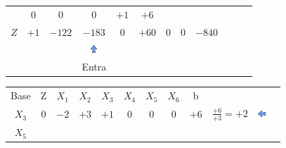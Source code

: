 \begin{frame}
{\begin{table}
\begin{tabular}{c c c c c c c c c c c c}
				& \cellcolor{yellow!50} $\scriptstyle 0$
				& \cellcolor{yellow!50} $\scriptstyle 0$
				& \cellcolor{yellow!50} $\scriptstyle 0$
				& \cellcolor{yellow!50} $\scriptstyle +1$
				& \cellcolor{yellow!50} $\scriptstyle +6$ \\
				\cellcolor{blue!100} \color{white} $\scriptstyle Z$
				& \cellcolor{yellow!50} $\scriptstyle +1$
				& \cellcolor{yellow!50} $\scriptstyle -122$
				& \cellcolor{gray!50} $\scriptstyle -183$
				& \cellcolor{yellow!50} $\scriptstyle 0$
				& \cellcolor{yellow!50} $\scriptstyle +60$
				& \cellcolor{yellow!50} $\scriptstyle 0$
				& \cellcolor{yellow!50} $\scriptstyle 0$ 
				& \cellcolor{yellow!50} $\scriptstyle -840$  \\
				& & & \includegraphics[width=0.3cm,height=0.3cm]{setacima.jpg} \\
				& & & \scriptsize Entra\\ 
			\end{tabular}
		\end{table}			
	}
	{
		\begin{table}		
			\begin{tabular}{c c c c c c c c c c c c}
				\cline{1-8} 
				\cellcolor{blue!100} \color{white} \scriptsize Base 
				&\cellcolor{blue!100} \color{white} \scriptsize Z 
				&\cellcolor{blue!100} \color{white} $\scriptstyle X_1$ 
				&\cellcolor{blue!100} \color{white} $\scriptstyle X_2$ 
				&\cellcolor{blue!100} \color{red}   $\scriptstyle X_3$ 
				&\cellcolor{blue!100} \color{white} $\scriptstyle X_4$ 
				&\cellcolor{blue!100} \color{red}   $\scriptstyle X_5$ 
				&\cellcolor{blue!100} \color{red}   $\scriptstyle X_6$ 
				&\cellcolor{blue!100} \color{white} \scriptsize b
				&
				&
				& \\
				\cellcolor{blue!100} \color{red} $\scriptstyle X_3$
				& \cellcolor{yellow!50} $\scriptstyle 0$
				& \cellcolor{yellow!50} $\scriptstyle -2$
				& \cellcolor{gray!50} $\scriptstyle +3$
				& \cellcolor{yellow!50} $\scriptstyle +1$
				& \cellcolor{yellow!50} $\scriptstyle 0$
				& \cellcolor{yellow!50} $\scriptstyle 0$
				& \cellcolor{yellow!50} $\scriptstyle 0$
				& \cellcolor{gray!50} $\scriptstyle +6$
				& $\scriptstyle \frac{+6}{+3}=+2$ & \includegraphics[width=0.3cm,height=0.3cm]{setaesquerda.jpg} \\
			    \cellcolor{blue!100} \color{red} $\scriptstyle X_5$

\end{tabular}
\end{table}}
\end{frame}
